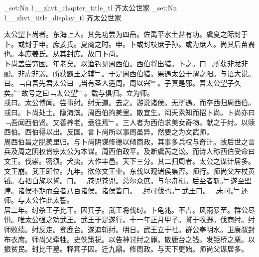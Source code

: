 \documentclass{zhvt-classic}
\begin{document}
\clearpage
\ExplSyntaxOn
\tl_set:Nn \l__zhvt_chapter_title_tl { 齐太公世家 }
\tl_set:Nn \l__zhvt_title_display_tl { 齐太公世家 }
\ExplSyntaxOff
\maketitle


\hspace*{2em}太公望卜尚者。东海上人。其先功尝为四岳。佐禹平水土甚有功。虞夏之际封于卜。或封于申。庶姜氏。夏商之时。申。卜或封枝庶子孙。或为庶人。尚其后苗裔也。本庶姜氏。从其封庶。故曰卜尚。\\
\hspace*{2em}卜尚盖尝穷困。年老矣。以渔钓见周西伯。西伯将出猎。卜之。曰﹁所获非龙非彨。非虎非罴。所获霸王之辅﹂。于是周西伯猎。果遇太公于渭之阳。与语大说。曰。﹁自吾先君太公曰﹃当有圣人适周。周以兴﹄。子真是邪。吾太公望子久矣。﹂故号之曰﹁太公望﹂。载与俱归。立为师。\\
\hspace*{2em}或曰。太公博闻。尝事纣。纣无道。去之。游说诸侯。无所遇。而卒西归周西伯。或曰。卜尚处士。隐海滨。周西伯拘羑里。散宜生。闳夭素知而招卜尚。卜尚亦曰﹁吾闻西伯贤。又善养老。盍往焉﹂。三人者为西伯求美女奇物。献之于纣。以赎西伯。西伯得以出。反国。言卜尚所以事周虽异。然要之为文武师。\\
\hspace*{2em}周西伯昌之脱羑里归。与卜尚阴谋修德以倾商政。其事多兵权与奇计。故后世之言兵及周之阴权皆宗太公为本谋。周西伯政平。及断虞芮之讼。而诗人称西伯受命曰文王。伐崇。密须。犬夷。大作丰邑。天下三分。其二归周者。太公之谋计居多。\\
\hspace*{2em}文王崩。武王即位。九年。欲修文王业。东伐以观诸侯集否。师行。师尚父左杖黄钺。右把白旄以誓。曰。﹁苍兕苍兕。总尔众庶。与尔舟楫。后至者斩。﹂遂至盟津。诸侯不期而会者八百诸侯。诸侯皆曰。﹁纣可伐也。﹂武王曰。﹁未可。﹂还师。与太公作此太誓。\\
\hspace*{2em}居二年。纣杀王子比干。囚箕子。武王将伐纣。卜龟兆。不吉。风雨暴至。群公尽惧。唯太公强之劝武王。武王于是遂行。十一年正月甲子。誓于牧野。伐商纣。纣师败绩。纣反走。登鹿台。遂追斩纣。明日。武王立于社。群公奉明水。卫康叔封布衣席。师尚父牵牲。史佚策祝。以告神讨纣之罪。散鹿台之钱。发钜桥之粟。以振贫民。封比干墓。释箕子囚。迁九鼎。修周政。与天下更始。师尚父谋居多。\\
\end{document}
